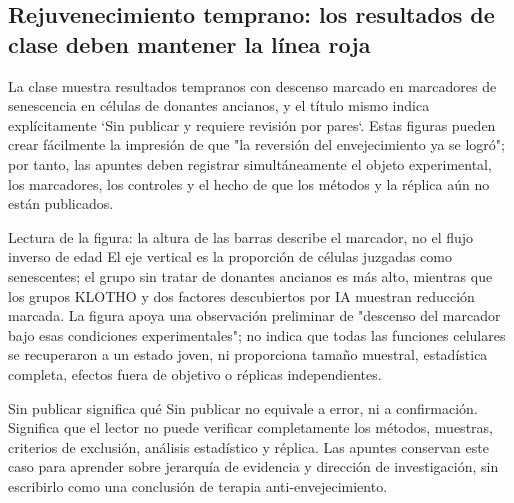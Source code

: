 \subsection{Rejuvenecimiento temprano: los resultados de clase deben mantener la línea roja}

La clase muestra resultados tempranos con descenso marcado en marcadores de senescencia en células de donantes ancianos, y el título mismo indica explícitamente `Sin publicar y requiere revisión por pares`. Estas figuras pueden crear fácilmente la impresión de que "la reversión del envejecimiento ya se logró"; por tanto, las apuntes deben registrar simultáneamente el objeto experimental, los marcadores, los controles y el hecho de que los métodos y la réplica aún no están publicados.


\begin{knowledgebox}{Lectura de la figura: la altura de las barras describe el marcador, no el flujo inverso de edad}
El eje vertical es la proporción de células juzgadas como senescentes; el grupo sin tratar de donantes ancianos es más alto, mientras que los grupos KLOTHO y dos factores descubiertos por IA muestran reducción marcada. La figura apoya una observación preliminar de "descenso del marcador bajo esas condiciones experimentales"; no indica que todas las funciones celulares se recuperaron a un estado joven, ni proporciona tamaño muestral, estadística completa, efectos fuera de objetivo o réplicas independientes.
\end{knowledgebox}

\begin{warningbox}{Sin publicar significa qué}
Sin publicar no equivale a error, ni a confirmación. Significa que el lector no puede verificar completamente los métodos, muestras, criterios de exclusión, análisis estadístico y réplica. Las apuntes conservan este caso para aprender sobre jerarquía de evidencia y dirección de investigación, sin escribirlo como una conclusión de terapia anti-envejecimiento.
\end{warningbox}


